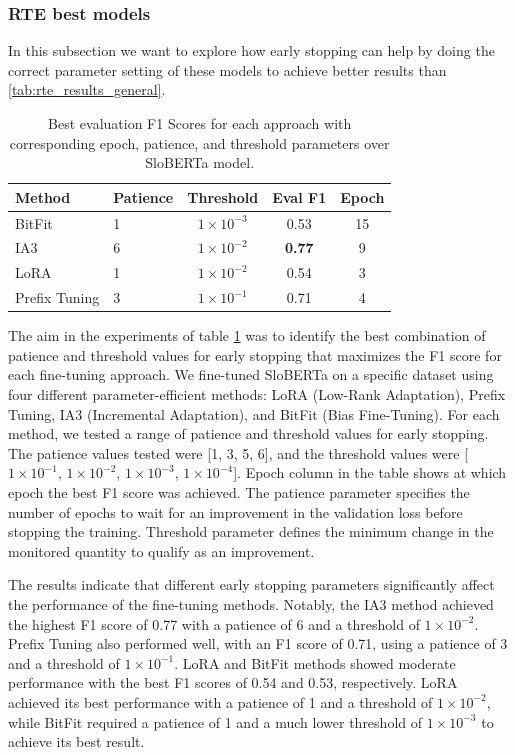 \documentclass[fleqn,moreauthors,10pt]{ds_report}
\begin{document}
\subsubsection{RTE best models}
In this subsection we want to explore how early stopping can help by doing the correct parameter setting of these models to achieve better results than \ref{tab:rte_results_general}.
\small
\begin{table}[h]
\centering
\begin{tabular}{@{}llccc@{}}
\toprule
\textbf{Method} & \textbf{Patience} & \textbf{Threshold} & \textbf{Eval F1} & \textbf{Epoch} \\
\midrule
BitFit & 1 & \(1 \times 10^{-3}\) & 0.53 & 15 \\
IA3 & 6 & \(1 \times 10^{-2}\) & \textbf{0.77} & 9 \\
LoRA & 1 & \(1 \times 10^{-2}\) & 0.54 & 3 \\
Prefix Tuning & 3 & \(1 \times 10^{-1}\) & 0.71 & 4 \\
\bottomrule
\end{tabular}
\caption{Best evaluation F1 Scores for each approach with corresponding epoch, patience, and threshold parameters over SloBERTa model.}
\label{tab:best_eval_f1_RTE}
\end{table}
The aim in the experiments of table \ref{tab:best_eval_f1_RTE} was to identify the best combination of patience and threshold values for early stopping that maximizes the F1 score for each fine-tuning approach. We fine-tuned SloBERTa on a specific dataset using four different parameter-efficient methods: LoRA (Low-Rank Adaptation), Prefix Tuning, IA3 (Incremental Adaptation), and BitFit (Bias Fine-Tuning). For each method, we tested a range of patience and threshold values for early stopping. The patience values tested were [1, 3, 5, 6], and the threshold values were [\(1 \times 10^{-1}\), \(1 \times 10^{-2}\), \(1 \times 10^{-3}\), \(1 \times 10^{-4}\)]. Epoch column in the table shows at which epoch the best F1 score was achieved. The patience parameter specifies the number of epochs to wait for an improvement in the validation loss before stopping the training. Threshold parameter defines the minimum change in the monitored quantity to qualify as an improvement. 

The results indicate that different early stopping parameters significantly affect the performance of the fine-tuning methods. Notably, the IA3 method achieved the highest F1 score of 0.77 with a patience of 6 and a threshold of \(1 \times 10^{-2}\). Prefix Tuning also performed well, with an F1 score of 0.71, using a patience of 3 and a threshold of \(1 \times 10^{-1}\). LoRA and BitFit methods showed moderate performance with the best F1 scores of 0.54 and 0.53, respectively. LoRA achieved its best performance with a patience of 1 and a threshold of \(1 \times 10^{-2}\), while BitFit required a patience of 1 and a much lower threshold of \(1 \times 10^{-3}\) to achieve its best result. 
\end{document}
